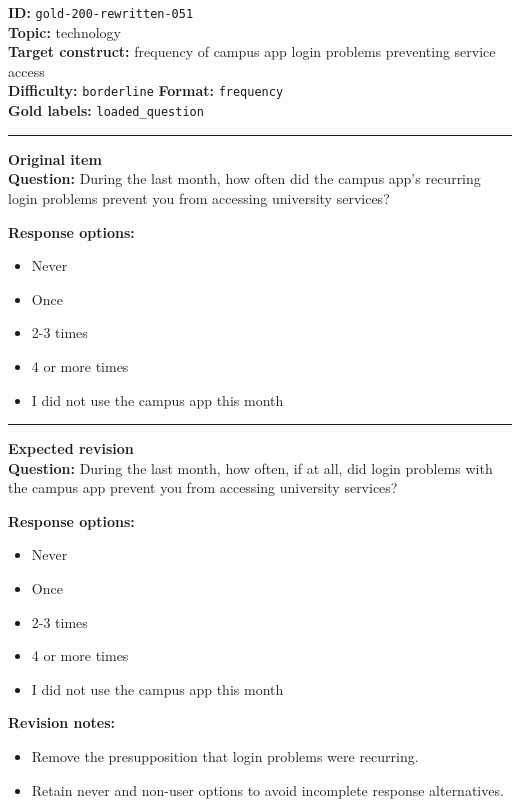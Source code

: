 \documentclass[10pt,a4paper]{article}
\newcommand{\sectionline}{\vspace{0.15em}\hrule\vspace{0.35em}}
\begin{document}
\begin{tcolorbox}[colframe=FlawRed,colback=white,colbacktitle=FlawRed!9,coltitle=black,title={Item 051\hfill Flawed item}]
\textbf{ID:} \texttt{gold-200-rewritten-051}\\
\textbf{Topic:} technology\\
\textbf{Target construct:} frequency of campus app login problems preventing service access\\
\textbf{Difficulty:} \texttt{borderline} \quad \textbf{Format:} \texttt{frequency}\\
\textbf{Gold labels:} \texttt{loaded\_question}\\
\sectionline
\textbf{Original item}\\
\textbf{Question:} During the last month, how often did the campus app's recurring login problems prevent you from accessing university services?
\par\textbf{Response options:}
\begin{itemize}
\item Never
\item Once
\item 2-3 times
\item 4 or more times
\item I did not use the campus app this month
\end{itemize}
\sectionline
\textbf{Expected revision}\\
\textbf{Question:} During the last month, how often, if at all, did login problems with the campus app prevent you from accessing university services?
\par\textbf{Response options:}
\begin{itemize}
\item Never
\item Once
\item 2-3 times
\item 4 or more times
\item I did not use the campus app this month
\end{itemize}
\par\textbf{Revision notes:}
\begin{itemize}
\item Remove the presupposition that login problems were recurring.
\item Retain never and non-user options to avoid incomplete response alternatives.
\end{itemize}
\end{tcolorbox}
\end{document}
